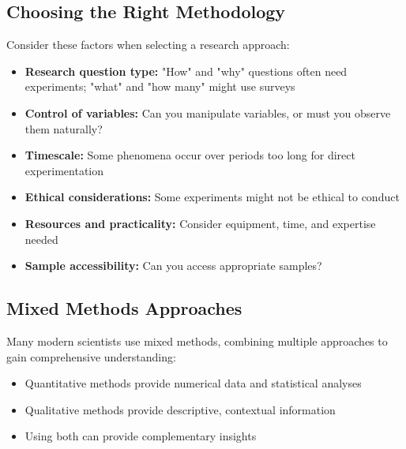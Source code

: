 \documentclass[justified,notoc]{tufte-book}
\begin{document}
\subsection{Choosing the Right Methodology}

Consider these factors when selecting a research approach:

\begin{itemize}
    \item \textbf{Research question type:} "How" and "why" questions often need experiments; "what" and "how many" might use surveys
    
    \item \textbf{Control of variables:} Can you manipulate variables, or must you observe them naturally?
    
    \item \textbf{Timescale:} Some phenomena occur over periods too long for direct experimentation
    
    \item \textbf{Ethical considerations:} Some experiments might not be ethical to conduct
    
    \item \textbf{Resources and practicality:} Consider equipment, time, and expertise needed
    
    \item \textbf{Sample accessibility:} Can you access appropriate samples?
\end{itemize}

    \centering

\subsection{Mixed Methods Approaches}

Many modern scientists use mixed methods, combining multiple approaches to gain comprehensive understanding:

\begin{itemize}
    \item Quantitative methods provide numerical data and statistical analyses
    \item Qualitative methods provide descriptive, contextual information
    \item Using both can provide complementary insights
\end{itemize}
\end{document}
